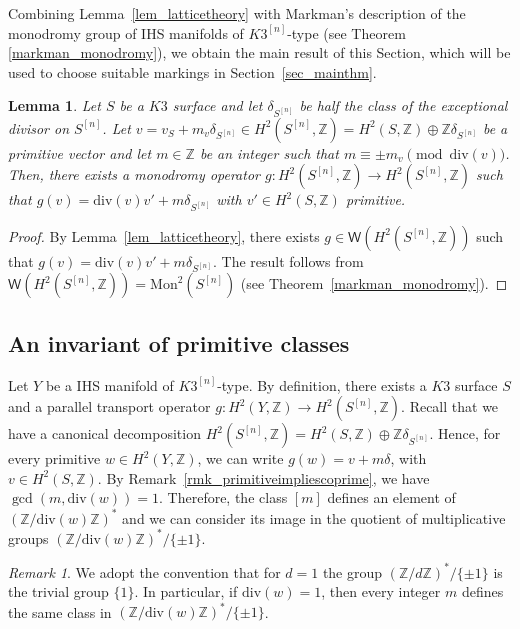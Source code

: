 \documentclass[12pt,a4paper]{amsart}
\theoremstyle{plain}
\newtheorem{lem}[thm]{Lemma}
\theoremstyle{definition}
\theoremstyle{remark}
\newtheorem{rmk}[thm]{Remark}
\def\H{H}
\newcommand{\ZZ}{\mathbb{Z}}
\newcommand{\dv}{\mathrm{div}}
\newcommand{\W}{\mathsf{W}}
\begin{document}
Combining Lemma~\ref{lem_latticetheory} with Markman’s description of the monodromy group of IHS manifolds of $K3^{[n]}$-type (see Theorem \ref{markman_monodromy}), we obtain the main result of this Section, which will be used to choose suitable markings in Section~\ref{sec_mainthm}.
\begin{lem}\label{lem_monodromy}
     Let $S$ be a $K3$ surface and let $\delta_{S^{[n]}}$ be half the class of the exceptional divisor on $S^{[n]}$. Let $v=v_S+m_v\delta_{S^{[n]}}\in \H^2(S^{[n]},\mathbb{Z})=\H^2(S,\mathbb{Z})\oplus\mathbb{Z}\delta_{S^{[n]}}$ be a primitive vector and let $m\in\mathbb{Z}$ be an integer such that $m \equiv \pm m_v \pmod{\mathrm{div}(v)}$. 
     Then, there exists a monodromy operator $g\colon \H^2(S^{[n]}, \mathbb{Z})\rightarrow \H^2(S^{[n]}, \mathbb{Z})$ such that $g(v)=\mathrm{div}(v) v'+m\delta_{S^{[n]}}$ with $v'\in \H^2(S,\mathbb{Z})$ primitive.
\end{lem}
\begin{proof}
    By Lemma~\ref{lem_latticetheory}, there exists $g\in \W(\H^2(S^{[n]},\ZZ))$ such that $g(v)=\mathrm{div}(v)v'+m\delta_{S^{[n]}}$. The result follows from $\W(\H^2(S^{[n]},\mathbb{Z}))=\mathrm{Mon}^2(S^{[n]})$ (see Theorem~\ref{markman_monodromy}). 
\end{proof}

\subsection{An invariant of primitive classes}
Let $Y$ be a IHS manifold of $K3^{[n]}$-type. By definition, there exists a $K3$ surface $S$ and a parallel transport operator $g\colon \H^2(Y,\mathbb{Z})\rightarrow \H^2(S^{[n]},\mathbb{Z})$. Recall that we have a canonical decomposition $\H^2(S^{[n]},\mathbb{Z})=\H^2(S,\mathbb{Z})\oplus\mathbb{Z}\delta_{S^{[n]}}$. Hence, for every primitive $w\in \H^2(Y,\mathbb{Z})$, we can write $g(w)=v+m\delta$, with $v\in \H^2(S,\mathbb{Z})$. By Remark~\ref{rmk_primitiveimpliescoprime}, we have $\gcd(m,\dv(w))=1$. Therefore, the class $[m]$ defines an element of $(\mathbb{Z}/\dv(w)\mathbb{Z})^*$ and we can consider its image in the quotient of multiplicative groups  $(\mathbb{Z}/\dv(w)\mathbb{Z})^*/\{\pm1\}$.

\begin{rmk}
    We adopt the convention that for $d=1$ the group $(\mathbb{Z}/d\mathbb{Z})^*/\{\pm1\}$ is the trivial group $\{1\}$. In particular, if $\dv(w)=1$, then every integer $m$ defines the same class in $(\mathbb{Z}/\dv(w)\mathbb{Z})^*/\{\pm1\}$.
\end{rmk}
\end{document}
